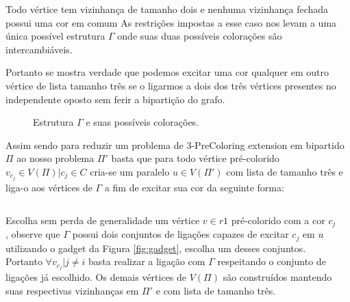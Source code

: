 \documentclass[9pt, compress]{beamer}
\newcommand{\?}{\textcolor{warn}{\textit{?}}}
\begin{document}
     \begin{frame}{Todo vértice tem vizinhança de tamanho dois e nenhuma vizinhança fechada possui uma cor em comum}
       As restrições impostas a esse caso nos levam a uma única possível estrutura $\Gamma$ onde suas duas possíveis colorações são intercambiáveis.
       
       Portanto se mostra verdade que podemos excitar uma cor qualquer em outro vértice de lista tamanho três se o ligarmos a dois dos três vértices presentes no independente oposto sem ferir a bipartição do grafo.
     \end{frame}
     \begin{frame}
      \begin{figure}[H]
        \centering
        \fontsize{4}{10}
        
        \caption{Estrutura $\Gamma$ e suas possíveis colorações.}
        \label{fig:2-edge-b}
      \end{figure}
      
      Assim sendo para reduzir um problema de 3-PreColoring extension em bipartido $\Pi$ ao nosso problema $\Pi'$ basta que para todo vértice pré-colorido $v_{c_j} \in V(\Pi) | c_j \in C$ cria-se um paralelo $u \in V(\Pi')$ com lista de tamanho três e liga-o aos vértices de $\Gamma$ a fim de excitar sua cor da seguinte forma:
      
     \end{frame}
     \begin{frame}
       \begin{columns}
        \begin{column}{0.5\textwidth}
          Escolha sem perda de generalidade um vértice $v \in r1$ pré-colorido com a cor $c_j$, observe que $\Gamma$ possui dois conjuntos de ligações capazes de excitar $c_j$ em $u$ utilizando o gadget da Figura \ref{fig:gadget}, escolha um desses conjuntos. Portanto $\forall v_{c_j} | j \neq i$ basta realizar a ligação com $\Gamma$ respeitando o conjunto de ligações já escolhido. Os demais vértices de $V(\Pi)$ são construídos mantendo suas respectivas vizinhanças em $\Pi'$ e com lista de tamanho três.
        \end{column}
        \begin{column}{0.5\textwidth}
        \end{column}
      \end{columns}
     \end{frame}
     
\end{document}
